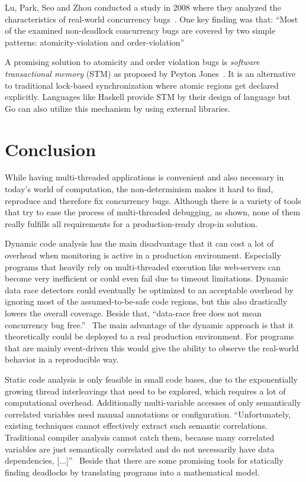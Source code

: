 \documentclass[conference]{IEEEtran}
\begin{document}
Lu, Park, Seo and Zhou conducted a study in 2008 where they analyzed the characteristics of real-world concurrency bugs~\cite{lu2008mistakes}.
One key finding was that:
``Most of the examined non-deadlock concurrency bugs are covered by two simple patterns: atomicity-violation and order-violation''~\cite{lu2008mistakes}

A promising solution to atomicity and order violation bugs is \emph{software transactional memory} (STM) as proposed by Peyton Jones~\cite{peytonjones2007beautiful}.
It is an alternative to traditional lock-based synchronization where atomic regions get declared explicitly.
Languages like Haskell provide STM by their design of language but Go can also utilize this mechanism by using external libraries.

\section{Conclusion}
\label{sct:conclusion}

While having multi-threaded applications is convenient and also necessary in today's world of computation, the non-determinism makes it hard to find, reproduce and therefore fix concurrency bugs.
Although there is a variety of tools that try to ease the process of multi-threaded debugging, as shown, none of them really fulfills all requirements for a production-ready drop-in solution.

Dynamic code analysis has the main disadvantage that it can cost a lot of overhead when monitoring is active in a production environment.
Especially programs that heavily rely on multi-threaded execution like web-servers  can become very inefficient or could even fail due to timeout limitations.
Dynamic data race detectors could eventually be optimized to an acceptable overhead by ignoring most of the assumed-to-be-safe code regions, but this also drastically lowers the overall coverage.
Beside that, ``data-race free does not mean concurrency bug free.''~\cite{lu2008mistakes}
The main advantage of the dynamic approach is that it theoretically could be deployed to a real production environment.
For programs that are mainly event-driven this would give the ability to observe the real-world behavior in a reproducible way.

Static code analysis is only feasible in small code bases, due to the exponentially growing thread interleavings that need to be explored, which requires a lot of computational overhead.
Additionally multi-variable accesses of only semantically correlated variables need manual annotations or configuration.
``Unfortunately, existing techniques cannot effectively extract such semantic correlations. Traditional compiler analysis cannot catch them, because many correlated variables are just semantically correlated and do not necessarily have data dependencies, [...]''~\cite{lu2007muvi}
Beside that there are some promising tools for statically finding deadlocks by translating programs into a mathematical model.
\end{document}
